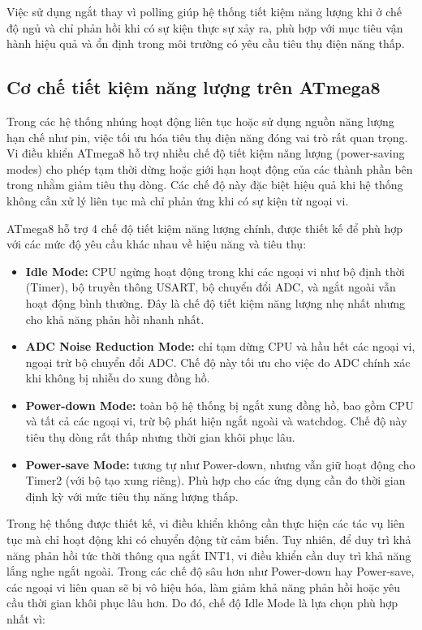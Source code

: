 \documentclass[../DoAn.tex]{subfiles}
\begin{document}
Việc sử dụng ngắt thay vì polling giúp hệ thống tiết kiệm năng lượng khi ở chế độ ngủ và chỉ phản hồi khi có sự kiện thực sự xảy ra, phù hợp với mục tiêu vận hành hiệu quả và ổn định trong môi trường có yêu cầu tiêu thụ điện năng thấp.

\subsection{Cơ chế tiết kiệm năng lượng trên ATmega8}
\label{section:4.3.3}

Trong các hệ thống nhúng hoạt động liên tục hoặc sử dụng nguồn năng lượng hạn chế như pin, việc tối ưu hóa tiêu thụ điện năng đóng vai trò rất quan trọng. Vi điều khiển ATmega8 hỗ trợ nhiều chế độ tiết kiệm năng lượng (power-saving modes) cho phép tạm thời dừng hoặc giới hạn hoạt động của các thành phần bên trong nhằm giảm tiêu thụ dòng. Các chế độ này đặc biệt hiệu quả khi hệ thống không cần xử lý liên tục mà chỉ phản ứng khi có sự kiện từ ngoại vi.

ATmega8 hỗ trợ 4 chế độ tiết kiệm năng lượng chính, được thiết kế để phù hợp với các mức độ yêu cầu khác nhau về hiệu năng và tiêu thụ:

\begin{itemize}
    \item \textbf{Idle Mode:} CPU ngừng hoạt động trong khi các ngoại vi như bộ định thời (Timer), bộ truyền thông USART, bộ chuyển đổi ADC, và ngắt ngoài vẫn hoạt động bình thường. Đây là chế độ tiết kiệm năng lượng nhẹ nhất nhưng cho khả năng phản hồi nhanh nhất.

    \item \textbf{ADC Noise Reduction Mode:} chỉ tạm dừng CPU và hầu hết các ngoại vi, ngoại trừ bộ chuyển đổi ADC. Chế độ này tối ưu cho việc đo ADC chính xác khi không bị nhiễu do xung đồng hồ.

    \item \textbf{Power-down Mode:} toàn bộ hệ thống bị ngắt xung đồng hồ, bao gồm CPU và tất cả các ngoại vi, trừ bộ phát hiện ngắt ngoài và watchdog. Chế độ này tiêu thụ dòng rất thấp nhưng thời gian khôi phục lâu.

    \item \textbf{Power-save Mode:} tương tự như Power-down, nhưng vẫn giữ hoạt động cho Timer2 (với bộ tạo xung riêng). Phù hợp cho các ứng dụng cần đo thời gian định kỳ với mức tiêu thụ năng lượng thấp.
\end{itemize}

Trong hệ thống được thiết kế, vi điều khiển không cần thực hiện các tác vụ liên tục mà chỉ hoạt động khi có chuyển động từ cảm biến. Tuy nhiên, để duy trì khả năng phản hồi tức thời thông qua ngắt INT1, vi điều khiển cần duy trì khả năng lắng nghe ngắt ngoài. Trong các chế độ sâu hơn như Power-down hay Power-save, các ngoại vi liên quan sẽ bị vô hiệu hóa, làm giảm khả năng phản hồi hoặc yêu cầu thời gian khôi phục lâu hơn. Do đó, chế độ Idle Mode là lựa chọn phù hợp nhất vì:
\end{document}
